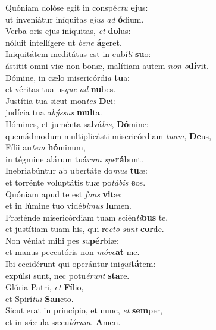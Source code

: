 \evenverse Quóniam dolóse egit in conspé\textit{ctu} \textbf{e}jus:~\*\\
\evenverse ut inveniátur iníquitas e\textit{jus} \textit{ad} \textbf{ó}dium.\\
\oddverse Verba oris ejus iníquitas, \textit{et} \textbf{do}lus:~\*\\
\oddverse nóluit intellígere ut \textit{be}\textit{ne} \textbf{á}geret.\\
\evenverse Iniquitátem meditátus est in cubí\textit{li} \textbf{su}o:~\*\\
\evenverse ástitit omni viæ non bonæ, malítiam autem \textit{non} \textit{o}\textbf{dí}vit.\\
\oddverse Dómine, in cælo misericórdi\textit{a} \textbf{tu}a:~\*\\
\oddverse et véritas tua us\textit{que} \textit{ad} \textbf{nu}bes.\\
\evenverse Justítia tua sicut mon\textit{tes} \textbf{De}i:~\*\\
\evenverse judícia tua a\textit{býs}\textit{sus} \textbf{mul}ta.\\
\oddverse Hómines, et juménta salvá\textit{bis}, \textbf{Dó}mine:~\*\\
\oddverse quemádmodum multiplicásti misericórdiam \textit{tu}\textit{am}, \textbf{De}us,\\
\evenverse Fílii au\textit{tem} \textbf{hó}minum,~\*\\
\evenverse in tégmine alárum tuá\textit{rum} \textit{spe}\textbf{rá}bunt.\\
\oddverse Inebriabúntur ab ubertáte do\textit{mus} \textbf{tu}æ:~\*\\
\oddverse et torrénte voluptátis tuæ po\textit{tá}\textit{bis} \textbf{e}os.\\
\evenverse Quóniam apud te est \textit{fons} \textbf{vi}tæ:~\*\\
\evenverse et in lúmine tuo vidé\textit{bi}\textit{mus} \textbf{lu}men.\\
\oddverse Præténde misericórdiam tuam scién\textit{ti}\textbf{bus} te,~\*\\
\oddverse et justítiam tuam his, qui re\textit{cto} \textit{sunt} \textbf{cor}de.\\
\evenverse Non véniat mihi pes \textit{su}\textbf{pér}biæ:~\*\\
\evenverse et manus peccatóris non \textit{mó}\textit{ve}\textbf{at} me.\\
\oddverse Ibi cecidérunt qui operántur ini\textit{qui}\textbf{tá}tem:~\*\\
\oddverse expúlsi sunt, nec potu\textit{é}\textit{runt} \textbf{sta}re.\\
\evenverse Glória Patri, \textit{et} \textbf{Fí}lio,~\*\\
\evenverse et Spirí\textit{tu}\textit{i} \textbf{San}cto.\\
\oddverse Sicut erat in princípio, et nunc, \textit{et} \textbf{sem}per,~\*\\
\oddverse et in sǽcula sæcu\textit{ló}\textit{rum}. \textbf{A}men.\\
